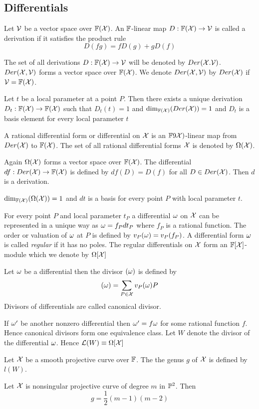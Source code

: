 \subsection{Differentials}
\begin{definition}[Derivation]
	Let $\mathcal{V}$ be a vector space over $\mathbb{F}(\mathcal{X})$. An $\mathbb{F}$-linear map $D:\mathbb{F}(\mathcal{X})\to\mathcal{V}$ is called a derivation if it satisfies the product rule $$D(fg)=fD(g)+gD(f)$$
\end{definition}
The set of all derivations $D:\mathbb{F}(\mathcal{X})\to\mathcal{V}$ will be denoted by $Der(\mathcal{X}.\mathcal{V})$. $Der(\mathcal{X},\mathcal{V})$ forms a vector space over $\mathbb{F}(\mathcal{X})$. We denote $Der(\mathcal{X},\mathcal{V})$ by $Der(\mathcal{X})$ if $\mathcal{V}=\mathbb{F}(\mathcal{X})$. 
\begin{theorem}
	Let $t$ be a local parameter at a point $P$. Then there exists a unique derivation $D_t:\mathbb{F}(\mathcal{X})\to \mathbb{F}(\mathcal{X})$  such that $D_t(t)=1$ and $\dim_{\mathbb{F}(\mathcal{X})}(Der(\mathcal{X}))=1$ and $D_t$ is a basis element for every local parameter $t$
\end{theorem}
\begin{definition}[Differential]
	A rational differential form or differential on $\mathcal{X}$ is an $\mathbb{F}9\mathcal{X})$-linear map from $Der(\mathcal{X})$ to $\mathbb{F}(\mathcal{X})$. The set of all rational differential forms $\mathcal{X}$ is denoted by $\Omega(\mathcal{X})$.
\end{definition}
Again $\Omega(\mathcal{X})$ forms a vector space over $\mathbb{F}(\mathcal{X})$. The differential $df:Der(\mathcal{X})\to \mathbb{F}(\mathcal{X})$ is defined by $df(D)=D(f)$ for all $D\in Der(\mathcal{X})$. Then $d$ is a derivation.
\begin{theorem}
	$\dim_{\mathbb{F}(\mathcal{X})}(\Omega(\mathcal{X}))=1$ and $dt$ is a basis for every point $P$ with local parameter $t$.
\end{theorem}
For every point $P$ and local parameter $t_P$ a differential  $\omega$ on $\mathcal{X}$ can be represented in a unique way as $\omega=f_Pdt_P$ where $f_P$ is a rational function. The order or valuation of $\omega$ at $P$ is defined by $v_P(\omega)=v_P(f_P)$. A differential form $\omega$ is called \textit{regular} if it has no poles. The regular differentials on $\mathcal{X}$ form an $\mathbb{F}[\mathcal{X}]$-module which we denote by $\Omega[\mathcal{X}]$
\begin{definition}
	Let $\omega$ be a differential then the divisor $(\omega)$ is defined by $$(\omega)=\sum_{P\in \mathcal{X}}v_P(\omega)P$$Divisors of differentials are called canonical divisor. 
\end{definition}
If $\omega'$ be another nonzero differential then $\omega'=f\omega$ for some rational function $f$. Hence canonical divisors form one equivalence class. Let $W$ denote the divisor of the differential $\omega$. Hence  $\mathcal{L}(W)\equiv \Omega[\mathcal{X}]$
\begin{definition}
	Let $\mathcal{X}$ be a smooth projective curve over $\mathbb{F}$. The the genus $g$ of $\mathcal{X}$ is defined by $l(W)$.
\end{definition}
\begin{theorem}
	Let $\mathcal{X}$ is nonsingular projective curve of degree $m$ in $\mathbb{P}^2$. Then $$g=\frac12(m-1)(m-2)$$
\end{theorem}



